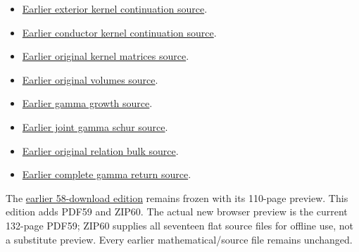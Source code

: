 \documentclass[
]{article}
\providecommand{\tightlist}{%
  \setlength{\itemsep}{0pt}\setlength{\parskip}{0pt}}
\begin{document}
\begin{itemize}
\tightlist
\item
  \href{https://github.com/KokunoYumeto/zeta-function-research-reader/tree/dad07e28faa735104ddc0b137521620fc315e6fc/workbenches/splitzero-tandem/continuations/20260914-exterior-kernel-continuation}{Earlier
  exterior kernel continuation source}.
\item
  \href{https://github.com/KokunoYumeto/zeta-function-research-reader/tree/41adc412ceb119ad9086b1f106e377f3de2d401a/workbenches/splitzero-tandem/continuations/20260914-conductor-kernel-continuation}{Earlier
  conductor kernel continuation source}.
\item
  \href{https://github.com/KokunoYumeto/zeta-function-research-reader/tree/5817ef9027257375b6ff3de7048b3331077251e7/workbenches/splitzero-tandem/continuations/20260914-original-kernel-matrices}{Earlier
  original kernel matrices source}.
\item
  \href{https://github.com/KokunoYumeto/zeta-function-research-reader/tree/1c8ec52c85c173adc9f8403a8a26914955e2f5a9/workbenches/splitzero-tandem/continuations/20260914-original-volumes}{Earlier
  original volumes source}.
\item
  \href{https://github.com/KokunoYumeto/zeta-function-research-reader/tree/41f020e0475429943252e69a1b4edd849393c780/workbenches/splitzero-tandem/continuations/20260914-gamma-growth}{Earlier
  gamma growth source}.
\item
  \href{https://github.com/KokunoYumeto/zeta-function-research-reader/tree/2be3b23974bf040f4ea06240b8a4b85372f7c71d/workbenches/splitzero-tandem/continuations/20260914-joint-gamma-schur}{Earlier
  joint gamma schur source}.
\item
  \href{https://github.com/KokunoYumeto/zeta-function-research-reader/tree/01fc8820e3a3ea69afa22b8ab1b0b5ca61869456/workbenches/splitzero-tandem/continuations/20260914-original-relation-bulk}{Earlier
  original relation bulk source}.
\item
  \href{https://github.com/KokunoYumeto/zeta-function-research-reader/tree/01fc8820e3a3ea69afa22b8ab1b0b5ca61869456/workbenches/splitzero-tandem/continuations/20260914-complete-gamma-return}{Earlier
  complete gamma return source}.
\end{itemize}

The \href{https://doi.org/10.5281/zenodo.22758970}{earlier 58-download
edition} remains frozen with its 110-page preview. This edition adds
PDF59 and ZIP60. The actual new browser preview is the current 132-page
PDF59; ZIP60 supplies all seventeen flat source files for offline use,
not a substitute preview. Every earlier mathematical/source file remains
unchanged.
\end{document}

